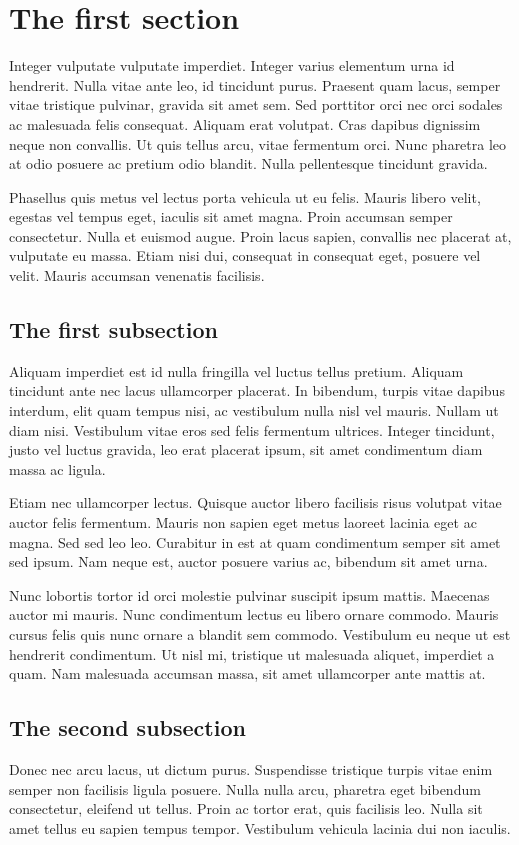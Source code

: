 \section{The first section}
\label{ch7:first}
Integer vulputate vulputate imperdiet. Integer varius elementum urna id hendrerit. Nulla vitae ante leo, id tincidunt purus. Praesent quam lacus, semper vitae tristique pulvinar, gravida sit amet sem. Sed porttitor orci nec orci sodales ac malesuada felis consequat. Aliquam erat volutpat. Cras dapibus dignissim neque non convallis. Ut quis tellus arcu, vitae fermentum orci. Nunc pharetra leo at odio posuere ac pretium odio blandit. Nulla pellentesque tincidunt gravida. 

Phasellus quis metus vel lectus porta vehicula ut eu felis. Mauris libero velit, egestas vel tempus eget, iaculis sit amet magna. Proin accumsan semper consectetur. Nulla et euismod augue. Proin lacus sapien, convallis nec placerat at, vulputate eu massa. Etiam nisi dui, consequat in consequat eget, posuere vel velit. Mauris accumsan venenatis facilisis.

\subsection{The first subsection}
\label{ch7:first:a}
Aliquam imperdiet est id nulla fringilla vel luctus tellus pretium. Aliquam tincidunt ante nec lacus ullamcorper placerat. In bibendum, turpis vitae dapibus interdum, elit quam tempus nisi, ac vestibulum nulla nisl vel mauris. Nullam ut diam nisi. Vestibulum vitae eros sed felis fermentum ultrices. Integer tincidunt, justo vel luctus gravida, leo erat placerat ipsum, sit amet condimentum diam massa ac ligula. 

Etiam nec ullamcorper lectus. Quisque auctor libero facilisis risus volutpat vitae auctor felis fermentum. Mauris non sapien eget metus laoreet lacinia eget ac magna. Sed sed leo leo. Curabitur in est at quam condimentum semper sit amet sed ipsum. Nam neque est, auctor posuere varius ac, bibendum sit amet urna. 

Nunc lobortis tortor id orci molestie pulvinar suscipit ipsum mattis. Maecenas auctor mi mauris. Nunc condimentum lectus eu libero ornare commodo. Mauris cursus felis quis nunc ornare a blandit sem commodo. Vestibulum eu neque ut est hendrerit condimentum. Ut nisl mi, tristique ut malesuada aliquet, imperdiet a quam. Nam malesuada accumsan massa, sit amet ullamcorper ante mattis at.

\subsection{The second subsection}
\label{ch7:first:b}
Donec nec arcu lacus, ut dictum purus. Suspendisse tristique turpis vitae enim semper non facilisis ligula posuere. Nulla nulla arcu, pharetra eget bibendum consectetur, eleifend ut tellus. Proin ac tortor erat, quis facilisis leo. Nulla sit amet tellus eu sapien tempus tempor. Vestibulum vehicula lacinia dui non iaculis. 

